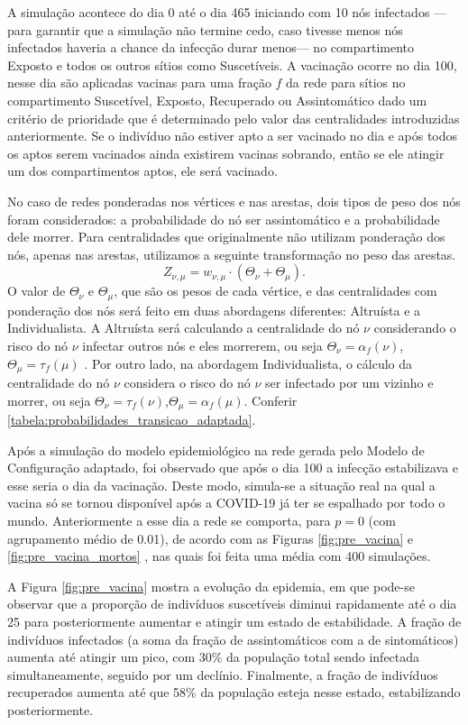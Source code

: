 A simulação acontece do dia 0 até o dia 465 iniciando com 10 nós infectados — para garantir que a simulação não termine cedo, caso tivesse menos nós infectados haveria a chance da infecção durar menos— 
no compartimento Exposto e todos os outros sítios como Suscetíveis. A vacinação ocorre no dia 100, nesse dia são aplicadas vacinas para uma fração $f$ da rede para sítios no compartimento Suscetível, Exposto, Recuperado ou Assintomático dado um critério de prioridade que é determinado pelo valor das centralidades introduzidas anteriormente. Se o indivíduo não estiver apto a ser vacinado no dia e após todos os aptos serem vacinados ainda existirem vacinas sobrando, então se ele atingir um dos compartimentos aptos, ele será vacinado.


No caso de redes ponderadas nos vértices e nas arestas, dois tipos de peso dos nós foram considerados: 
a probabilidade do nó ser assintomático e a probabilidade dele morrer. 
Para centralidades que originalmente não utilizam ponderação dos nós, apenas nas arestas, utilizamos a seguinte transformação no peso das arestas. 
\begin{equation}
    Z_{\nu,\mu} = w_{\nu,\mu}\cdot(\Theta_\nu + \Theta_\mu).
\end{equation}
O valor de $\Theta_\nu$ e $\Theta_\mu$, que são os pesos de cada vértice, e das centralidades com ponderação dos nós será feito em duas abordagens diferentes: Altruísta e a Individualista. A Altruísta será calculando 
a centralidade do nó $\nu$ considerando o risco do nó $\nu$ infectar outros nós e eles morrerem, ou seja $\Theta_\nu = \alpha_f(\nu)$,$\Theta_\mu = \tau_f(\mu)$ . Por outro lado, na abordagem Individualista, o cálculo da centralidade do nó $\nu$ considera o risco do nó $\nu$ ser infectado por um vizinho e morrer, ou seja $\Theta_\nu = \tau_f(\nu)$,$\Theta_\mu = \alpha_f(\mu)$. Conferir \ref{tabela:probabilidades_transicao_adaptada}.  

Após a 
simulação do modelo epidemiológico 
na rede gerada pelo Modelo de Configuração adaptado,
foi observado que após o dia 100 a infecção estabilizava e esse seria o dia da vacinação. 
Deste modo, simula-se a situação real na qual a vacina só se tornou disponível após a COVID-19 já ter se espalhado por todo o mundo. Anteriormente a esse dia a rede se comporta, para $p = 0$ (com agrupamento médio de 0.01), de acordo com as Figuras \ref{fig:pre_vacina} e \ref{fig:pre_vacina_mortos}
, nas quais foi feita uma média com 400 simulações.

A Figura \ref{fig:pre_vacina} mostra a evolução da epidemia, em que pode-se observar que a proporção de indivíduos suscetíveis diminui rapidamente até o dia 25
para posteriormente aumentar e atingir um estado de estabilidade. A fração de indivíduos infectados (a soma da fração de assintomáticos com a de sintomáticos) aumenta até atingir um pico, com  30\% da população total sendo infectada simultaneamente, seguido por um declínio. Finalmente, a fração de indivíduos recuperados aumenta até que 58\% da população esteja nesse estado, estabilizando posteriormente. 

